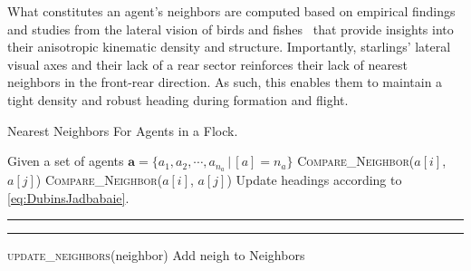 %
What constitutes an agent's neighbors are computed based on empirical findings and studies from the lateral vision of birds and fishes~\cite{Ballerini1232, JadbabaieCoord, Helbing20} that provide insights into their anisotropic kinematic density and structure. Importantly, starlings' lateral visual axes and their lack of a rear sector reinforces their lack of nearest neighbors in the front-rear direction. As such, this enables them to maintain a tight density and robust heading during formation and flight.
%
\begin{algorithm}[tb!]
	\caption{Nearest Neighbors For Agents in a Flock.
		\label{alg:neighbors}}
	\begin{algorithmic}[1]
		\State Given a set of agents $\bm{a} = \{a_1, a_2, \cdots, a_{n_a} \,| \,[a] = n_a\}$ 
		\label{alg:neighbors:line:lateral_vision_left}
		\State \textsc{Compare\_Neighbor($a[i]$, $a[j]$)}
		\EndFor
		\label{alg:neighbors:line:lateral_vision_right}
		\State \textsc{Compare\_Neighbor($a[i]$, $a[j]$)}
		\EndFor
		\EndFor
		\State Update headings according to \eqref{eq:DubinsJadbabaie}.
		\EndFor 
		\EndFunction
	\end{algorithmic}
	\hrule
	\begin{algorithmic}[1]
		\EndIf
		\EndFunction
	\end{algorithmic}
	\hrule
	\begin{algorithmic}[1]
		\State {}
		\State \textsc{\textsf{update\_neighbors}}(\textup{neighbor})
		\EndFor 
		\EndIf
		\State Add \textup{\textsf{neigh}} to \textsf{Neighbors}
		\EndFunction
		\EndProcedure
	\end{algorithmic}
\end{algorithm}
